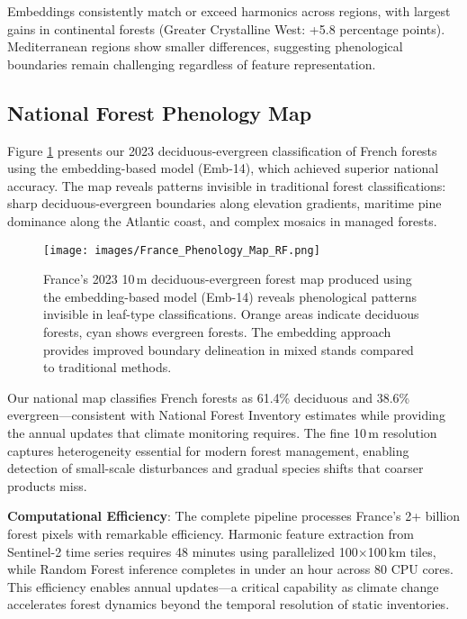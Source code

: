 \documentclass[utf8]{FrontiersinHarvard}
\begin{document}
Embeddings consistently match or exceed harmonics across regions, with largest gains in continental forests (Greater Crystalline West: +5.8 percentage points). Mediterranean regions show smaller differences, suggesting phenological boundaries remain challenging regardless of feature representation.


\subsection{National Forest Phenology Map}

Figure \ref{fig:national_map} presents our 2023 deciduous-evergreen classification of French forests using the embedding-based model (Emb-14), which achieved superior national accuracy. The map reveals patterns invisible in traditional forest classifications: sharp deciduous-evergreen boundaries along elevation gradients, maritime pine dominance along the Atlantic coast, and complex mosaics in managed forests.

\begin{figure}[H]
    \centering
    \texttt{[image: images/France\_Phenology\_Map\_RF.png]}
    \caption{France's 2023 10\,m deciduous-evergreen forest map produced using the embedding-based model (Emb-14) reveals phenological patterns invisible in leaf-type classifications. Orange areas indicate deciduous forests, cyan shows evergreen forests. The embedding approach provides improved boundary delineation in mixed stands compared to traditional methods.}
    \label{fig:national_map}
\end{figure}

Our national map classifies French forests as 61.4\% deciduous and 38.6\% evergreen—consistent with National Forest Inventory estimates while providing the annual updates that climate monitoring requires. The fine 10\,m resolution captures heterogeneity essential for modern forest management, enabling detection of small-scale disturbances and gradual species shifts that coarser products miss.

\textbf{Computational Efficiency}: The complete pipeline processes France's 2+ billion forest pixels with remarkable efficiency. Harmonic feature extraction from Sentinel-2 time series requires 48 minutes using parallelized 100×100\,km tiles, while Random Forest inference completes in under an hour across 80 CPU cores. This efficiency enables annual updates—a critical capability as climate change accelerates forest dynamics beyond the temporal resolution of static inventories.
\end{document}
